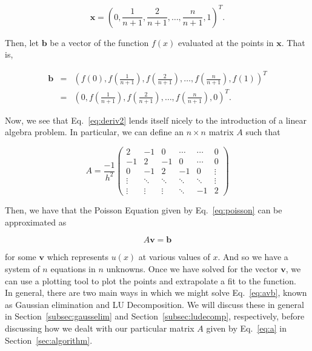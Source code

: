 \documentclass[12pt]{article}
\numberwithin{equation}{section}
\begin{document}
$$\textbf{x} = \left(0,\frac{1}{n+1},\frac{2}{n+1},\ldots,\frac{n}{n+1},1\right)^{T}.$$

\noindent Then, let $\textbf{b}$ be a vector of the function $f\left(x\right)$ evaluated at the points in $\textbf{x}$.  That is,

$$\begin{array}{ccc}\textbf{b} &=& \left(f\left(0\right),f\left(\frac{1}{n+1}\right),f\left(\frac{2}{n+1}\right),\ldots,f\left(\frac{n}{n+1}\right),f\left(1\right)\right)^{T} \\
&=& \left(0,f\left(\frac{1}{n+1}\right),f\left(\frac{2}{n+1}\right),\ldots,f\left(\frac{n}{n+1}\right),0\right)^{T}.
\end{array}$$

\noindent Now, we see that Eq.~\ref{eq:deriv2} lends itself nicely to the introduction of a linear algebra problem.  In particular, we can define an $n\times n$ matrix $A$ such that

\begin{equation}
\label{eq:a}
A = \frac{-1}{h^{2}} \left(
\begin{array}{cccccc}
2 & -1 & 0 & \cdots & \cdots & 0 \\
-1 & 2 & -1 & 0 & \cdots & 0 \\
0 & -1 & 2 & -1 & 0 & \vdots \\
\vdots & \ddots & \ddots & \ddots & \ddots & \vdots \\
\vdots & \vdots & \vdots & \ddots & -1 & 2
\end{array}
\right)
\end{equation}

\noindent Then, we have that the Poisson Equation given by Eq.~\ref{eq:poisson} can be approximated as 

\begin{equation}
\label{eq:avb}
A\textbf{v}=\textbf{b}
\end{equation}

\noindent for some $\textbf{v}$ which represents $u\left(x\right)$ at various values of $x$.  And so we have a system of $n$ equations in $n$ unknowns.  Once we have solved for the vector $\textbf{v}$, we can use a plotting tool to plot the points and extrapolate a fit to the function.
\\\indent In general, there are two main ways in which we might solve  Eq.~\ref{eq:avb}, known as Gaussian elimination and LU Decomposition.  We will discuss these in general in Section~\ref{subsec:gausselim} and Section~\ref{subsec:ludecomp}, respectively, before discussing how we dealt with our particular matrix $A$ given by Eq.~\ref{eq:a} in Section~\ref{sec:algorithm}.
\end{document}
